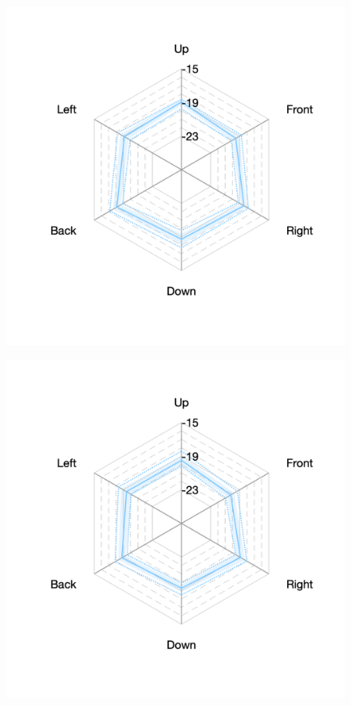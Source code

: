 \documentclass[11pt,a4j]{jreport}
\begin{document}
\begin{figure}[H]
\begin{minipage}[b]{.33\textwidth}
    \label{fig:ホールEにおけるSTlate}
  \end{minipage}%
  \begin{minipage}[b]{.33\textwidth}
    \centering
    \includegraphics[width=1\linewidth]{images/realHallDirSt/late_hall_f_allpoints.png}
    \label{fig:ホールFにおけるSTlate}
  \end{minipage}

  \begin{minipage}[b]{.33\textwidth}
    \centering
    \includegraphics[width=1\linewidth]{images/realHallDirSt/late_hall_g_allpoints.png}
    \label{fig:ホールGにおけるSTlate}
  \end{minipage}


\end{figure}
\end{document}
